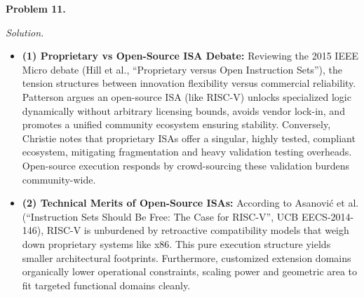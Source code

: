 \documentclass[11pt]{article}
\newcommand{\problem}[1]{\vspace{0.5em}\noindent\textbf{Problem #1.}\vspace{0.3em}}
\newenvironment{solution}{\par\noindent\textit{Solution.}}{\par\vspace{1em}}
\begin{document}
\problem{11}
\begin{solution}
    \begin{itemize}
        \item \textbf{(1) Proprietary vs Open-Source ISA Debate:}
        Reviewing the 2015 IEEE Micro debate (Hill et al., ``Proprietary versus Open Instruction Sets''), the tension structures between innovation flexibility versus commercial reliability. 
        Patterson argues an open-source ISA (like RISC-V) unlocks specialized logic dynamically without arbitrary licensing bounds, avoids vendor lock-in, and promotes a unified community ecosystem ensuring stability. Conversely, Christie notes that proprietary ISAs offer a singular, highly tested, compliant ecosystem, mitigating fragmentation and heavy validation testing overheads. Open-source execution responds by crowd-sourcing these validation burdens community-wide.
        \item \textbf{(2) Technical Merits of Open-Source ISAs:}
        According to Asanovi\'c et al. (``Instruction Sets Should Be Free: The Case for RISC-V'', UCB EECS-2014-146), RISC-V is unburdened by retroactive compatibility models that weigh down proprietary systems like x86. This pure execution structure yields smaller architectural footprints. Furthermore, customized extension domains organically lower operational constraints, scaling power and geometric area to fit targeted functional domains cleanly.
    \end{itemize}
\end{solution}
\end{document}
